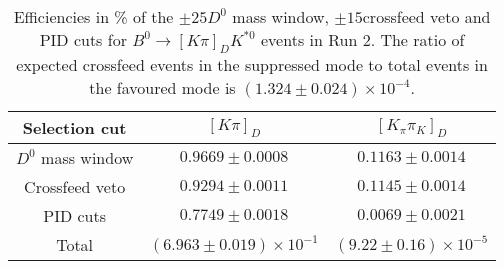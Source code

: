 \begin{table}
    \centering
    \begin{tabular}{ccc}
        \toprule
Selection cut & $[K \pi]_D$ & $[K_\pi \pi_K]_D$ \\
        \midrule
$D^0$ mass window & $0.9669 \pm 0.0008$ & $0.1163 \pm 0.0014$ \\
Crossfeed veto & $0.9294 \pm 0.0011$ & $0.1145 \pm 0.0014$ \\
PID cuts & $0.7749 \pm 0.0018$ & $0.0069 \pm 0.0021$\\
        \midrule
Total & $(6.963 \pm 0.019) \times 10^{-1}$ & $(9.22 \pm 0.16) \times 10^{-5}$\\
        \bottomrule
    \end{tabular}
    \caption{Efficiencies in \% of the $\pm 25$\mev $D^0$ mass window, $\pm 15$\mev crossfeed veto and PID cuts for $B^0 \to [K\pi]_D K^{*0}$ events in Run 2. The ratio of expected crossfeed events in the suppressed mode to total events in the favoured mode is $(1.324 \pm 0.024) \times 10^{-4}$.}
\label{tab:double_misID_eff_Kpi_run2}
\end{table}
